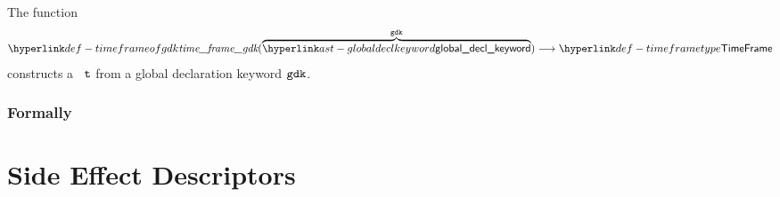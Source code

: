 \hypertarget{def-timeframeofgdk}{}
The function
\[
    \timeframeofgdk(\overname{\globaldeclkeyword}{\gdk}) \aslto \TTimeFrame
\]
constructs a \timeframeterm\ $\vt$ from a global declaration keyword $\gdk$.

\subsubsection{Formally}
\begin{mathpar}
\end{mathpar}

\section{Side Effect Descriptors\label{sec:SideEffectDescriptors}}

